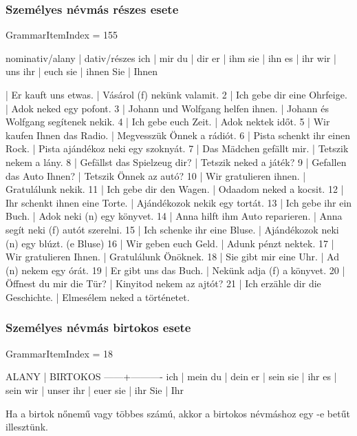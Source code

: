 \documentclass{article}
\newenvironment{desc}{\verbatim}{\endverbatim}
\newenvironment{exmp}{\verbatim}{\endverbatim}
\begin{document}
\subsubsection{Személyes névmás részes esete}

GrammarItemIndex = 155

\begin{desc}
nominativ/alany | dativ/részes 
ich             | mir 
du              | dir 
er              | ihm 
sie             | ihn
es              | ihr 
wir             | uns 
ihr             | euch 
sie             | ihnen  
Sie             | Ihnen 
\end{desc}

\begin{exmp}
1 | Er kauft uns etwas. | Vásárol (f) nekünk valamit.
2 | Ich gebe dir eine Ohrfeige. | Adok neked egy pofont.
3 | Johann und Wolfgang helfen ihnen. | Johann és Wolfgang segítenek nekik.
4 | Ich gebe euch Zeit. | Adok nektek időt.
5 | Wir kaufen Ihnen das Radio. | Megvesszük Önnek a rádiót.
6 | Pista schenkt ihr einen Rock. | Pista ajándékoz neki egy szoknyát.
7 | Das Mädchen gefällt mir. | Tetszik nekem a lány.
8 | Gefällst das Spielzeug dir? | Tetszik neked a játék?
9 | Gefallen das Auto Ihnen? | Tetszik Önnek az autó?
10 | Wir gratulieren ihnen. | Gratulálunk nekik.
11 | Ich gebe dir den Wagen. | Odaadom neked a kocsit.
12 | Ihr schenkt ihnen eine Torte. | Ajándékozok nekik egy tortát.
13 | Ich gebe ihr ein Buch. | Adok neki (n) egy könyvet.
14 | Anna hilft ihm Auto reparieren. | Anna segít neki (f) autót szerelni.
15 | Ich schenke ihr eine Bluse. | Ajándékozok neki (n) egy blúzt. (e Bluse)
16 | Wir geben euch Geld. | Adunk pénzt nektek.
17 | Wir gratulieren Ihnen. | Gratulálunk Önöknek.
18 | Sie gibt mir eine Uhr. | Ad (n) nekem egy órát.
19 | Er gibt uns das Buch. | Nekünk adja (f) a könyvet.
20 | Öffnest du mir die Tür? | Kinyitod nekem az ajtót?
21 | Ich erzähle dir die Geschichte. | Elmesélem neked a történetet.
\end{exmp}

\subsubsection{Személyes névmás birtokos esete}

GrammarItemIndex = 18

\begin{desc}
ALANY | BIRTOKOS 
------+----------
ich   | mein
du    | dein
er    | sein
sie   | ihr
es    | sein
wir   | unser
ihr   | euer
sie   | ihr
Sie   | Ihr

Ha a birtok nőnemű vagy többes számú, akkor a birtokos névmáshoz
egy -e betűt illesztünk.
\end{desc}
\end{document}
